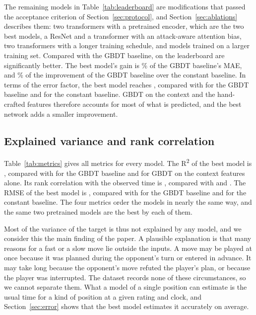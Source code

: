 \documentclass[11pt]{article}
\begin{document}
The remaining models in Table~\ref{tab:leaderboard} are modifications that
passed the acceptance criterion of Section~\ref{sec:protocol}, and
Section~\ref{sec:ablations} describes them\ifchangestart: two transformers
with a pretrained encoder, which are the two best models\fi\ifshapes, a
ResNet and a transformer with an attack-aware attention
bias\fi\ifchangeepochs, two transformers with a longer training
schedule\fi\ifmore, and models trained on a larger training set\fi. Compared
with the GBDT baseline,  on the leaderboard are
significantly better. The best model's gain is \% of the
GBDT baseline's MAE, and \% of the improvement of the
GBDT baseline over the constant baseline. In terms of the error factor, the
best model reaches , compared with
 for the GBDT baseline and  for
the constant baseline. GBDT on the context and the hand-crafted features
therefore accounts for most of what is predicted, and the best network adds a
smaller improvement.

\subsection{Explained variance and rank correlation}

Table~\ref{tab:metrics} gives all metrics for every model. The
R\textsuperscript{2} of the best model is , compared with
 for the GBDT baseline and  for GBDT on
the context features alone. Its rank correlation with the observed time is
, compared with  and
. The RMSE of the best model is ,
compared with  for the GBDT baseline and  for
the constant baseline. The four metrics order the models in nearly the same
way, and the same two pretrained models are the best by each of them.

\begin{table}[htbp]\centering\small
{}
\caption{All metrics for every model on the test set. MAE and RMSE are
errors of the target and lower is better. For R\textsuperscript{2} and
Spearman's rank correlation higher is better. The constant baseline predicts
a single value and has no rank correlation.}
\label{tab:metrics}
\end{table}

Most of the variance of the target is thus not explained by any model, and
we consider this the main finding of the paper. A plausible explanation is
that many reasons for a fast or a slow move lie outside the inputs. A move
may be played at once because it was planned during the opponent's turn or
entered in advance. It may take long because the opponent's move refuted the
player's plan, or because the player was interrupted. The dataset records
none of these circumstances, so we cannot separate them. What a model of a
single position can estimate is the usual time for a kind of position at a
given rating and clock, and Section~\ref{sec:error} shows that the best model
estimates it accurately on average.
\end{document}
